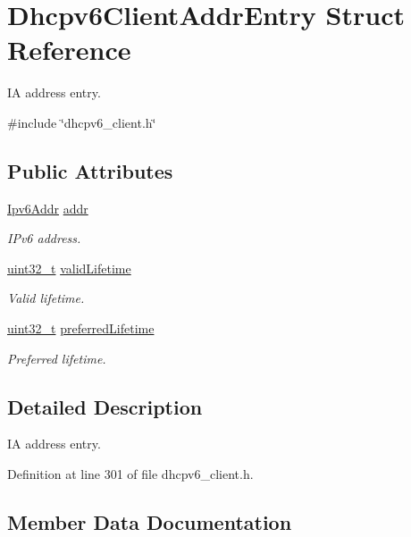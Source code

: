\hypertarget{structDhcpv6ClientAddrEntry}{}\section{Dhcpv6\+Client\+Addr\+Entry Struct Reference}
\label{structDhcpv6ClientAddrEntry}


IA address entry.  




{\ttfamily \#include \char`\"{}dhcpv6\+\_\+client.\+h\char`\"{}}

\subsection*{Public Attributes}
\begin{DoxyCompactItemize}
\item 
\hyperlink{ipv6_8h_aed0cbc40c61ed5b4fb681ebc55237e89}{Ipv6\+Addr} \hyperlink{structDhcpv6ClientAddrEntry_a3f15eb3e64b43ca99e49e090d3c0eb72}{addr}
\begin{DoxyCompactList}\small\item\em I\+Pv6 address. \end{DoxyCompactList}\item 
\hyperlink{stdint_8h_a435d1572bf3f880d55459d9805097f62}{uint32\+\_\+t} \hyperlink{structDhcpv6ClientAddrEntry_a975d3431d046a9dadc2e6a6594a09168}{valid\+Lifetime}
\begin{DoxyCompactList}\small\item\em Valid lifetime. \end{DoxyCompactList}\item 
\hyperlink{stdint_8h_a435d1572bf3f880d55459d9805097f62}{uint32\+\_\+t} \hyperlink{structDhcpv6ClientAddrEntry_a24e1399fe28c7e13c134de1e2953e051}{preferred\+Lifetime}
\begin{DoxyCompactList}\small\item\em Preferred lifetime. \end{DoxyCompactList}\end{DoxyCompactItemize}


\subsection{Detailed Description}
IA address entry. 

Definition at line 301 of file dhcpv6\+\_\+client.\+h.



\subsection{Member Data Documentation}
\mbox{\label{structDhcpv6ClientAddrEntry_a3f15eb3e64b43ca99e49e090d3c0eb72}} 

